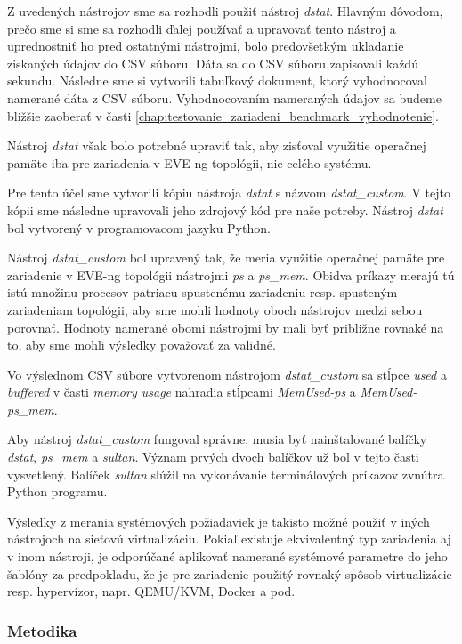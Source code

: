 Z uvedených nástrojov sme sa rozhodli použiť nástroj \emph{dstat}. Hlavným dôvodom, prečo sme si sme sa rozhodli ďalej používať a upravovať tento nástroj a uprednostniť ho pred ostatnými nástrojmi, bolo predovšetkým ukladanie ziskaných údajov do CSV súboru. Dáta sa do CSV súboru zapisovali každú sekundu. Následne sme si vytvorili tabuľkový dokument, ktorý vyhodnocoval namerané dáta z CSV súboru. Vyhodnocovaním nameraných údajov sa budeme bližšie zaoberať v časti \ref{chap:testovanie_zariadeni_benchmark_vyhodnotenie}.

Nástroj \emph{dstat} však bolo potrebné upraviť tak, aby zisťoval využitie operačnej pamäte iba pre zariadenia v EVE-ng topológii, nie celého systému.

Pre tento účel sme vytvorili kópiu nástroja \emph{dstat} s názvom \emph{dstat\_custom}. V tejto kópii sme následne upravovali jeho zdrojový kód pre naše potreby. Nástroj \emph{dstat} bol vytvorený v programovacom jazyku Python.

Nástroj \emph{dstat\_custom} bol upravený tak, že meria využitie operačnej pamäte pre zariadenie v EVE-ng topológii nástrojmi \emph{ps} a \emph{ps\_mem}. Obidva príkazy merajú tú istú množinu procesov patriacu spustenému zariadeniu resp. spusteným zariadeniam topológii, aby sme mohli hodnoty oboch nástrojov medzi sebou porovnať. Hodnoty namerané obomi nástrojmi by mali byť približne rovnaké na to, aby sme mohli výsledky považovať za validné.

Vo výslednom CSV súbore vytvorenom nástrojom \emph{dstat\_custom} sa stĺpce \emph{used} a \emph{buffered} v časti \emph{memory usage} nahradia stĺpcami \emph{MemUsed-ps} a \emph{MemUsed-ps\_mem}.

Aby nástroj \emph{dstat\_custom} fungoval správne, musia byť nainštalované balíčky \emph{dstat}, \emph{ps\_mem} a \emph{sultan}. Význam prvých dvoch balíčkov už bol v tejto časti vysvetlený. Balíček \emph{sultan} slúžil na vykonávanie terminálových príkazov zvnútra Python programu.

Výsledky z merania systémových požiadaviek je takisto možné použiť v iných nástrojoch na sieťovú virtualizáciu. Pokiaľ existuje ekvivalentný typ zariadenia aj v inom nástroji, je odporúčané aplikovať namerané systémové parametre do jeho šablóny za predpokladu, že je pre zariadenie použitý rovnaký spôsob virtualizácie resp. hypervízor, napr. QEMU/KVM, Docker a pod.





\subsubsection{Metodika}

